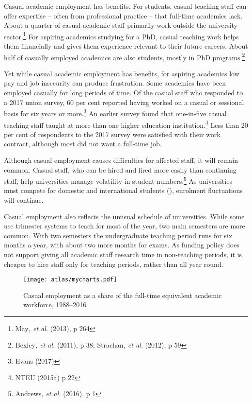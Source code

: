 \documentclass{grattan}
\begin{document}
Casual academic employment has benefits. For students, casual teaching staff can offer expertise -- often from professional practice -- that full-time academics lack. About a quarter of casual academic staff primarily work outside the university sector.\footnote{May\emph{, et al.} (2013), p 264} For aspiring academics studying for a PhD, casual teaching work helps them financially and gives them experience relevant to their future careers. About half of casually employed academics are also students, mostly in PhD programs.\footnote{Bexley\emph{, et al.} (2011), p 38; Strachan\emph{, et al.} (2012), p 59}

Yet while casual academic employment has benefits, for aspiring academics low pay and job insecurity can produce frustration. Some academics have been employed casually for long periods of time. Of the casual staff who responded to a 2017 union survey, 60 per cent reported having worked on a casual or sessional basis for six years or more.\footnote{Evans (2017)} An earlier survey found that one-in-five casual teaching staff taught at more than one higher education institution.\footnote{NTEU (2015a) p 22} Less than 20 per cent of respondents to the 2017 survey were satisfied with their work contract, although most did not want a full-time job.

Although casual employment causes difficulties for affected staff, it will remain common. Casual staff, who can be hired and fired more easily than continuing staff, help universities manage volatility in student numbers.\footnote{Andrews\emph{, et al.} (2016), p 1} As universities must compete for domestic and international students (), enrolment fluctuations will continue.

Casual employment also reflects the unusual schedule of universities. While some use trimester systems to teach for most of the year, two main semesters are more common. With two semesters the undergraduate teaching period runs for six months a year, with about two more months for exams. As funding policy does not support giving all academic staff research time in non-teaching periods, it is cheaper to hire staff only for teaching periods, rather than all year round.


    \begin{figure} %
    \caption{Casual employment as a share of the full-time equivalent academic workforce, 1988--2016}\label{fig:casual-employment-as-a-share-of-the-fulltime-equivalent-academic-workforce-19882016}
    \texttt{[image: atlas/mycharts.pdf]}
    \end{figure}
\end{document}
